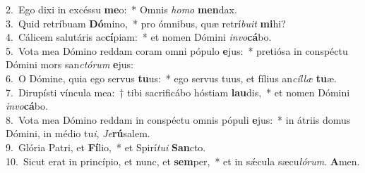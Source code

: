 {2.~}Ego dixi in excéssu \textbf{me}o:~* Omnis \textit{ho}\textit{mo} \textbf{men}dax.\\
{3.~}Quid retríbuam \textbf{Dó}mino,~* pro ómnibus, quæ retrí\textit{bu}\textit{it} \textbf{mi}hi?\\
{4.~}Cálicem salutáris ac\textbf{cí}piam:~* et nomen Dómini \textit{in}\textit{vo}\textbf{cá}bo.\\
{5.~}Vota mea Dómino reddam coram omni pópulo \textbf{e}jus:~* pretiósa in conspéctu Dómini mors san\textit{ctó}\textit{rum} \textbf{e}jus:\\
{6.~}O Dómine, quia ego servus \textbf{tu}us:~* ego servus tuus, et fílius an\textit{cíl}\textit{læ} \textbf{tu}æ.\\
{7.~}Dirupísti víncula mea:~† tibi sacrificábo hóstiam \textbf{lau}dis,~* et nomen Dómini \textit{in}\textit{vo}\textbf{cá}bo.\\
{8.~}Vota mea Dómino reddam in conspéctu omnis pópuli \textbf{e}jus:~* in átriis domus Dómini, in médio tu\textit{i}, \textit{Je}\textbf{rú}salem.\\
{9.~}Glória Patri, et \textbf{Fí}lio,~* et Spirí\textit{tu}\textit{i} \textbf{San}cto.\\
{10.~}Sicut erat in princípio, et nunc, et \textbf{sem}per,~* et in sǽcula sæcu\textit{ló}\textit{rum}. \textbf{A}men.\\
